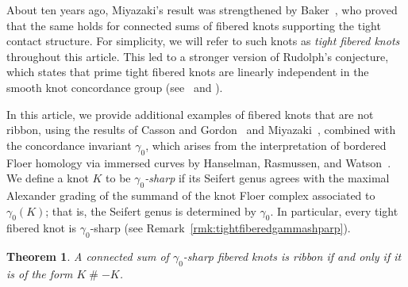 \documentclass[11pt, reqno]{amsart}
\newtheorem{theorem}{Theorem}[section]
\theoremstyle{definition}
\theoremstyle{remark}
\numberwithin{equation}{section}
\begin{document}
About ten years ago, Miyazaki's result was strengthened by Baker~\cite{Baker:2016}, who proved that the same holds for connected sums of fibered knots supporting the tight contact structure. For simplicity, we will refer to such knots as \emph{tight fibered knots} throughout this article. This led to a stronger version of Rudolph's conjecture, which states that prime tight fibered knots are linearly independent in the smooth knot concordance group (see~\cite[Corollary 5]{Baker:2016} and \cite[Lemma 3.1]{Abe-Tagami:2016}).


In this article, we provide additional examples of fibered knots that are not ribbon, using the results of Casson and Gordon~\cite{Casson-Gordon:1983} and Miyazaki~\cite{Miyazaki:1994}, combined with the concordance invariant $\gamma_0$, which arises from the interpretation of bordered Floer homology \cite{LOT} via immersed curves by Hanselman, Rasmussen, and Watson~\cite{HRW:2022, HRW:2024, Hanselman-Watson:2023}. We define a knot $K$ to be \emph{$\gamma_0$-sharp} if its Seifert genus agrees with the maximal Alexander grading of the summand of the knot Floer complex associated to $\gamma_0(K)$; that is, the Seifert genus is determined by $\gamma_0$. In particular, every tight fibered knot is $\gamma_0$-sharp (see Remark~\ref{rmk:tightfiberedgammashparp}).

%


\begin{theorem}\label{thm:main}
A connected sum of $\gamma_0$-sharp fibered knots  is ribbon if and only if it is of the form $K \mathbin{\#} -K$.
\end{theorem}






\end{document}
